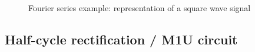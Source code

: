 \begin{frame}
\begin{figure}
        
        \caption{Fourier series example: representation of a square wave signal}
        \label{fig:Fourier_series_square_wave}
    \end{figure}
\end{frame}

\subsection{Half-cycle rectification / M1U circuit} 


